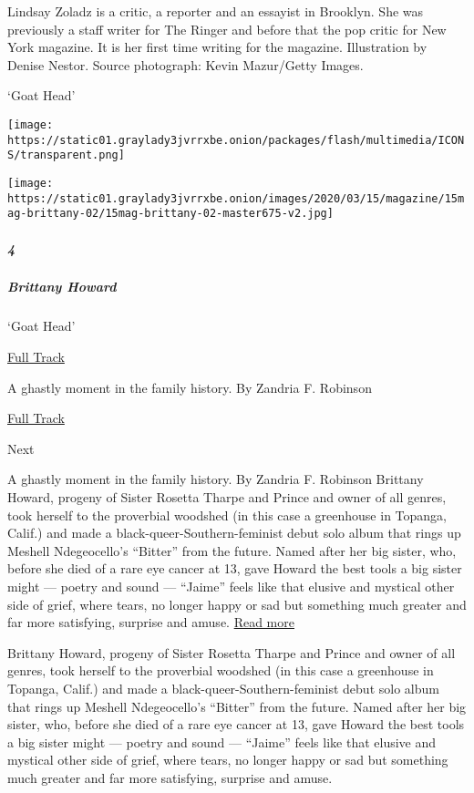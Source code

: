 Lindsay Zoladz is a critic, a reporter and an essayist in Brooklyn. She
was previously a staff writer for The Ringer and before that the pop
critic for New York magazine. It is her first time writing for the
magazine. Illustration by Denise Nestor. Source photograph: Kevin
Mazur/Getty Images.

`Goat Head'

\texttt{[image: https://static01.graylady3jvrrxbe.onion/packages/flash/multimedia/ICONS/transparent.png]}

\texttt{[image: https://static01.graylady3jvrrxbe.onion/images/2020/03/15/magazine/15mag-brittany-02/15mag-brittany-02-master675-v2.jpg]}

\hypertarget{4}{%
\subparagraph{4}\label{4}}

\hypertarget{brittany-howard}{%
\subparagraph{Brittany Howard}\label{brittany-howard}}

`Goat Head'

\href{https://open.spotify.com/track/4rGUfotRdDyEmen7Hs83Jg?si=eSfqicVxSNOPZcBGmQiW4Q}{
Full Track}

A ghastly moment in the family history. By Zandria F. Robinson

\href{https://open.spotify.com/track/4rGUfotRdDyEmen7Hs83Jg?si=eSfqicVxSNOPZcBGmQiW4Q}{Full
Track }

Next

A ghastly moment in the family history. By Zandria F. Robinson Brittany
Howard, progeny of Sister Rosetta Tharpe and Prince and owner of all
genres, took herself to the proverbial woodshed (in this case a
greenhouse in Topanga, Calif.) and made a black-queer-Southern-feminist
debut solo album that rings up Meshell Ndegeocello's ``Bitter'' from the
future. Named after her big sister, who, before she died of a rare eye
cancer at 13, gave Howard the best tools a big sister might --- poetry
and sound --- ``Jaime'' feels like that elusive and mystical other side
of grief, where tears, no longer happy or sad but something much greater
and far more satisfying, surprise and amuse.
\href{https://www.nytimes3xbfgragh.onion/interactive/2020/03/11/magazine/brittany-howard.html}{Read
more}

Brittany Howard, progeny of Sister Rosetta Tharpe and Prince and owner
of all genres, took herself to the proverbial woodshed (in this case a
greenhouse in Topanga, Calif.) and made a black-queer-Southern-feminist
debut solo album that rings up Meshell Ndegeocello's ``Bitter'' from the
future. Named after her big sister, who, before she died of a rare eye
cancer at 13, gave Howard the best tools a big sister might --- poetry
and sound --- ``Jaime'' feels like that elusive and mystical other side
of grief, where tears, no longer happy or sad but something much greater
and far more satisfying, surprise and amuse.

